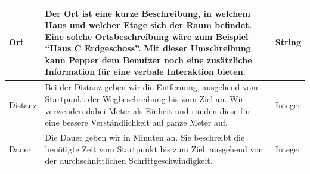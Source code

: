 \begin{tabular}{| l | p{9.45cm} | c| }
    \hline
    Ort                                                                                                                                                                                                                                                                                                                                                                                                                                                                                                                                                             & \small Der Ort ist eine kurze Beschreibung, in welchem Haus und welcher Etage sich der Raum befindet. Eine solche Ortsbeschreibung wäre zum Beispiel “Haus C Erdgeschoss”. Mit dieser Umschreibung kann Pepper dem Benutzer noch eine zusätzliche Information für eine verbale Interaktion bieten. & String   \\
    \hline
    Distanz                                                                                                                                                                                                                                                                                                                                                                                                                                                                                                                                                         & \small Bei der Distanz geben wir die Entfernung, ausgehend vom Startpunkt der Wegbeschreibung bis zum Ziel an. Wir verwenden dabei Meter als Einheit und runden diese für eine bessere Verständlichkeit auf ganze Meter auf.                                                                       & Integer  \\
    \hline
    Dauer                                                                                                                                                                                                                                                                                                                                                                                                                                                                                                                                                           & \small Die Dauer geben wir in Minuten an. Sie beschreibt die benötigte Zeit vom Startpunkt bis zum Ziel, ausgehend von der durchschnittlichen Schrittgeschwindigkeit.                                                                                                                              & Integer  \\
    \hline
\end{tabular} \vspace{5mm}

